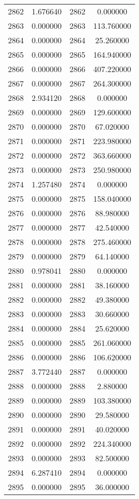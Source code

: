 \documentclass[12pt]{article}
\begin{document}
\begin{longtable}{@{}cccc@{}}
2862 & 1.676640 & 2862 & 0.000000 \\
2863 & 0.000000 & 2863 & 113.760000 \\
2864 & 0.000000 & 2864 & 25.260000 \\
2865 & 0.000000 & 2865 & 164.940000 \\
2866 & 0.000000 & 2866 & 407.220000 \\
2867 & 0.000000 & 2867 & 264.300000 \\
2868 & 2.934120 & 2868 & 0.000000 \\
2869 & 0.000000 & 2869 & 129.600000 \\
2870 & 0.000000 & 2870 & 67.020000 \\
2871 & 0.000000 & 2871 & 223.980000 \\
2872 & 0.000000 & 2872 & 363.660000 \\
2873 & 0.000000 & 2873 & 250.980000 \\
2874 & 1.257480 & 2874 & 0.000000 \\
2875 & 0.000000 & 2875 & 158.040000 \\
2876 & 0.000000 & 2876 & 88.980000 \\
2877 & 0.000000 & 2877 & 42.540000 \\
2878 & 0.000000 & 2878 & 275.460000 \\
2879 & 0.000000 & 2879 & 64.140000 \\
2880 & 0.978041 & 2880 & 0.000000 \\
2881 & 0.000000 & 2881 & 38.160000 \\
2882 & 0.000000 & 2882 & 49.380000 \\
2883 & 0.000000 & 2883 & 30.660000 \\
2884 & 0.000000 & 2884 & 25.620000 \\
2885 & 0.000000 & 2885 & 261.060000 \\
2886 & 0.000000 & 2886 & 106.620000 \\
2887 & 3.772440 & 2887 & 0.000000 \\
2888 & 0.000000 & 2888 & 2.880000 \\
2889 & 0.000000 & 2889 & 103.380000 \\
2890 & 0.000000 & 2890 & 29.580000 \\
2891 & 0.000000 & 2891 & 40.020000 \\
2892 & 0.000000 & 2892 & 224.340000 \\
2893 & 0.000000 & 2893 & 82.500000 \\
2894 & 6.287410 & 2894 & 0.000000 \\
2895 & 0.000000 & 2895 & 36.000000 \\

\end{longtable}
\end{document}
